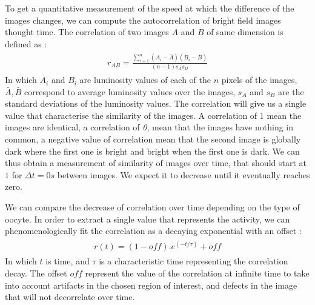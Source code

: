 \documentclass[A4paperpaper,11pt,english]{sphinxmanual}
\begin{document}
To get a quantitative measurement of the speed at which the difference of the
images changes, we can compute the autocorrelation of bright field images
thought time. The correlation of two images \(A\) and \(B\) of same
dimension is defined as :
\label{index-latex:equation-eqa501}\begin{gather}
\begin{split}r_{AB}=\frac{\sum\limits_{i=1}^n (A_i-\bar{A})(B_i-\bar{B})}{(n-1) s_A s_B}\end{split}\label{index-latex-eqa501}
\end{gather}
In which \(A_i\) and \(B_i\) are luminosity values of each of the
\(n\) pixels of the images,  \(\bar{A},\bar{B}\) correspond to average
luminosity values over the images, \(s_A\) and \(s_B\) are the standard
deviations of the luminosity values. The correlation will give us a single
value that characterise the similarity of the images. A correlation of
\(1\) mean the images are identical, a correlation of \emph{0}, mean that the
images have nothing in common, a negative value of correlation mean that the
second image is globally dark where the first one is bright and bright when the
first one is dark. We can thus obtain a measurement of similarity of images
over time, that should start at \(1\) for \(\Delta t=0s\) between
images. We expect it to decrease until it eventually reaches zero.

We can compare the decrease of correlation over time depending on the type of
oocyte. In order to extract a single value that represents the activity, we can
phenomenologically fit the correlation as a decaying exponential with an offset
:
\label{index-latex:equation-edecay}\begin{gather}
\begin{split}r(t) = (1-off).e^{(-t/\tau)}+off\end{split}\label{index-latex-edecay}
\end{gather}
In which \(t\) is time, and \(\tau\) is a characteristic time
representing the correlation decay. The offset  \(off\) represent the value
of the correlation at infinite time to take into account artifacts in the chosen
region of interest, and defects in the image that will not decorrelate over
time.
\end{document}
